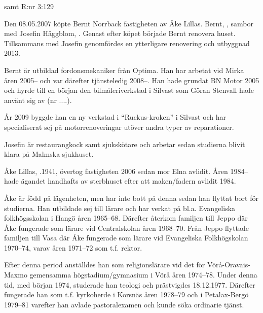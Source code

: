  samt  R:nr 3:129




Den 08.05.2007 köpte Bernt Norrback fastigheten av Åke Lillas. Bernt, ,  sambor med Josefin Häggblom, . Genast efter köpet började Bernt renovera huset. Tillsammans med Josefin genomfördes en ytterligare renovering och utbyggnad 2013.

Bernt är utbildad fordonsmekaniker från Optima. Han har arbetat vid Mirka åren 2005-- och var därefter tjänsteledig 2008--. Han hade grundat BN Motor 2005 och hyrde till en början den bilmåleriverkstad i Silvast som Göran Stenvall hade använt sig av (nr ....).

År 2009 byggde han en ny verkstad i ``Ruckus-kroken'' i Silvast och har specialiserat sej på motorrenoveringar utöver andra typer av 	reparationer.

Josefin är restaurangkock samt sjukskötare och arbetar sedan studierna blivit klara på Malmska sjukhuset.
\begin{jhchildren}
  \item {}
  \item {}
\end{jhchildren}


Åke Lillas, .1941, övertog fastigheten 2006 sedan mor Elna avlidit. Åren 1984-- hade ägandet handhafts av sterbhuset efter	att maken/fadern avlidit 1984.

Åke är född på lägenheten, men har inte bott på denna sedan han	flyttat bort för studierna. Han utbildade sej till lärare och har verkat	på bl.a. Evangeliska folkhögsskolan i Hangö åren 1965--68. Därefter	återkom familjen till Jeppo där Åke fungerade som lärare vid Centralskolan åren 1968--70. Från Jeppo flyttade familjen till Vasa där Åke fungerade som lärare vid Evangeliska Folkhögskolan 1970--74, varav	åren 1971--72 som t.f. rektor.

Efter denna period anställdes han som religionslärare vid det för	Vörå-Oravais-Maxmo gemensamma högstadium/gymnasium i Vörå	åren 1974--78. Under denna tid, med början 1974, studerade han	teologi och prästvigdes 18.12.1977. Därefter fungerade han som t.f.	kyrkoherde i Korsnäs åren 1978--79 och i Petalax-Bergö 1979--81 varefter han avlade pastoralexamen och kunde söka ordinarie tjänst.

